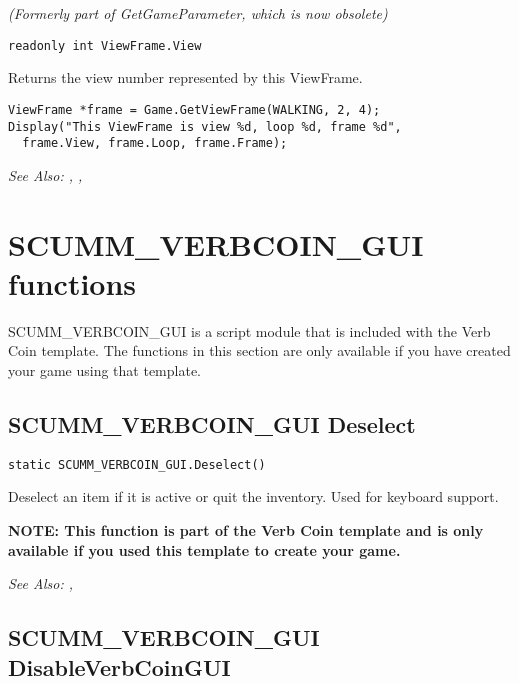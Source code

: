 \it{(Formerly part of GetGameParameter, which is now obsolete)}

\begin{verbatim}
readonly int ViewFrame.View
\end{verbatim}
Returns the view number represented by this ViewFrame.

\begin{verbatim}
ViewFrame *frame = Game.GetViewFrame(WALKING, 2, 4);
Display("This ViewFrame is view %d, loop %d, frame %d",
  frame.View, frame.Loop, frame.Frame);
\end{verbatim}

\it{See Also:} ,
,



\section{SCUMM_VERBCOIN_GUI functions}

SCUMM_VERBCOIN_GUI is a script module that is included with the Verb Coin template.
The functions in this section are only available if you have created your game
using that template.




\subsection{SCUMM_VERBCOIN_GUI Deselect}\label{SCUMM_VERBCOIN_GUI.Deselect}%

\begin{verbatim}
static SCUMM_VERBCOIN_GUI.Deselect()
\end{verbatim}
Deselect an item if it is active or quit the inventory. Used for keyboard support.

\bf{NOTE:} This function is part of the Verb Coin template and is only available if
you used this template to create your game.

\it{See Also:} ,


\subsection{SCUMM_VERBCOIN_GUI DisableVerbCoinGUI}\label{SCUMM_VERBCOIN_GUI.DisableVerbCoinGUI}%

